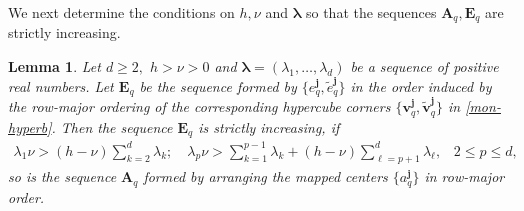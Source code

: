 \documentclass[10pt,reqno,final]{amsart}
\newtheorem{lmm}{\bf Lemma}[section]
\newenvironment{lemma}{\begin{lmm}}{\end{lmm}}
\theoremstyle{remark}
\theoremstyle{definition}
\newcommand{\bs}[1]{\boldsymbol{#1}}
\begin{document}
We next determine the conditions on $h,\nu$ and $\bs \lambda$ so that the sequences  $\bs A_q, \bs E_q$ are strictly increasing.  
\begin{lemma}\label{lmm:Hypercube-Sep} Let $d\ge 2,$ $h>\nu>0$ and  $\bs \lambda=(\lambda_1, \ldots, \lambda_d)$ be a  sequence of positive real numbers. 
Let $\bs E_q$ be the sequence formed by $\{e_q^{\bs j}, \tilde e_q^{\bs j}\}$ in the order induced by the row-major ordering of the corresponding hypercube corners $\{\bs v_q^{\bs j}, 
\tilde {\bs v}_q^{\bs j}\}$ in \eqref{mon-hyperb}. Then the sequence $\bs E_q$ is strictly increasing, if 
\begin{equation}\label{lmbdcondforDdim}
\begin{split}
\lambda_1 \nu > (h-\nu)\sum_{k=2}^d \lambda_k;
\quad 
\lambda_p \nu >
\sum\limits_{k=1}^{p-1}\lambda_k +(h-\nu)\sum\limits_{\ell=p+1}^d \lambda_\ell,\;\;\; 2\le p\le d,
\end{split}
\end{equation}   
so is the sequence $\bs A_q$ formed by arranging the mapped centers
$\{a_q^{\bs j}\}$ in row-major order.  
\end{lemma}
\end{document}
